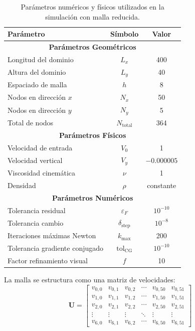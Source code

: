 \documentclass[11pt,letterpaper]{article}
\begin{document}
\begin{table}[H]
\centering
\begin{tabular}{|l|c|c|}
\hline
\textbf{Parámetro} & \textbf{Símbolo} & \textbf{Valor} \\
\hline
\multicolumn{3}{|c|}{\textbf{Parámetros Geométricos}} \\
\hline
Longitud del dominio & $L_x$ & 400 \\
Altura del dominio & $L_y$ & 40 \\
Espaciado de malla & $h$ & 8 \\
Nodos en dirección $x$ & $N_x$ & 50 \\
Nodos en dirección $y$ & $N_y$ & 5 \\
Total de nodos & $N_{\text{total}}$ & 364 \\
\hline
\multicolumn{3}{|c|}{\textbf{Parámetros Físicos}} \\
\hline
Velocidad de entrada & $V_0$ & 1 \\
Velocidad vertical & $V_y$ & $-0.000005$ \\
Viscosidad cinemática & $\nu$ & 1 \\
Densidad & $\rho$ & constante \\
\hline
\multicolumn{3}{|c|}{\textbf{Parámetros Numéricos}} \\
\hline
Tolerancia residual & $\varepsilon_F$ & $10^{-10}$ \\
Tolerancia cambio & $\delta_{\text{step}}$ & $10^{-8}$ \\
Iteraciones máximas Newton & $k_{\max}$ & 200 \\
Tolerancia gradiente conjugado & $\text{tol}_{\text{CG}}$ & $10^{-10}$ \\
Factor refinamiento visual & $f$ & 10 \\
\hline
\end{tabular}
\caption{Parámetros numéricos y físicos utilizados en la simulación con malla reducida.}
\label{tab:parametros}
\end{table}

La malla se estructura como una matriz de velocidades:
\[
\mathbf{U} = \begin{bmatrix}
v_{0,0} & v_{0,1} & v_{0,2} & \cdots & v_{0,50} & v_{0,51} \\
v_{1,0} & v_{1,1} & v_{1,2} & \cdots & v_{1,50} & v_{1,51} \\
v_{2,0} & v_{2,1} & v_{2,2} & \cdots & v_{2,50} & v_{2,51} \\
\vdots & \vdots & \vdots & \ddots & \vdots & \vdots \\
v_{6,0} & v_{6,1} & v_{6,2} & \cdots & v_{6,50} & v_{6,51}
\end{bmatrix}
\]
\end{document}
